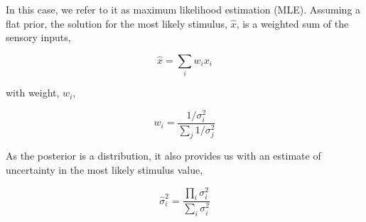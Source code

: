 In this case, we refer to it as maximum  likelihood estimation (MLE). Assuming a flat prior, the solution for the  most likely stimulus, $\hat{x}$, is a weighted sum of the sensory inputs,

\begin{equation}
\hat{x}=\sum_i w_i x_i
\end{equation}

with weight, $w_i$,

\begin{equation}
w_i = \frac{1/\sigma^2_i}{\sum_j 1/\sigma^2_j}
\end{equation}

As the posterior is a distribution, it also provides us with an estimate of uncertainty in  the most likely stimulus value,

\begin{equation}
\hat{\sigma}^2_i = \frac{\prod_i \sigma^2_i}{\sum_i \sigma^2_i}
\end{equation}







